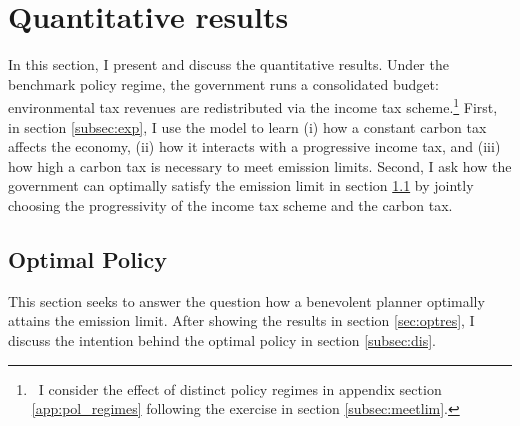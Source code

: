 \section{Quantitative results}\label{sec:res}

In this section, I present and discuss the quantitative results. Under the benchmark policy regime, the government runs a consolidated budget: environmental tax revenues are redistributed via the income tax scheme.\footnote{\ I consider the effect of distinct policy regimes in appendix section \ref{app:pol_regimes} following the exercise in section \ref{subsec:meetlim}. }
First, in section \ref{subsec:exp}, I use the model to learn (i) how a constant carbon tax affects the economy, (ii) how it interacts with a progressive income tax, and (iii) how high a carbon tax is necessary to meet emission limits.
Second, I ask how the government can optimally satisfy the emission limit in section \ref{subsec:mr} by jointly choosing the progressivity of the income tax scheme and the carbon tax. 




\subsection{Optimal Policy}\label{subsec:mr}


This section seeks to answer the question how a benevolent planner optimally attains the emission limit. After showing the results in section \ref{sec:optres}, I discuss the intention behind the optimal policy in section \ref{subsec:dis}. 

